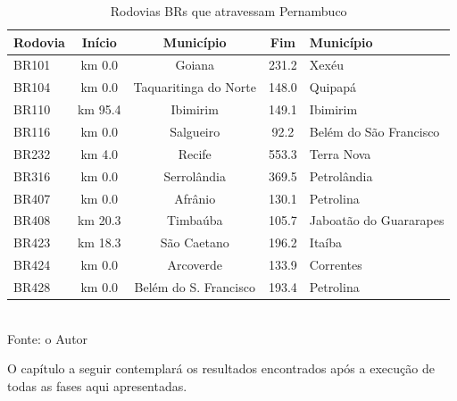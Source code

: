 \begin{table}[!ht]
	\centering
	\caption{Rodovias BRs que atravessam Pernambuco}
	\vspace{1mm}
	\begin{tabular}{l|c|c|c|l}
		\hline
		\textbf{Rodovia} & \textbf{Início} & \textbf{Município}  & \textbf{Fim} & \textbf{Município} \\
		\hline
		BR101 & km 0.0 & Goiana & 231.2 & Xexéu\\
		BR104 & km 0.0 & Taquaritinga do Norte & 148.0 & Quipapá\\
		BR110 & km 95.4 & Ibimirim & 149.1 & Ibimirim\\
		BR116 & km 0.0 & Salgueiro & 92.2 & Belém do São Francisco\\
		BR232 & km 4.0 & Recife & 553.3 & Terra Nova\\
		BR316 & km 0.0 & Serrolândia & 369.5 & Petrolândia\\
		BR407 & km 0.0 & Afrânio & 130.1 & Petrolina\\
		BR408 & km 20.3 & Timbaúba & 105.7 & Jaboatão do Guararapes\\
		BR423 & km 18.3 & São Caetano & 196.2 & Itaíba\\
		BR424 & km 0.0 & Arcoverde & 133.9 & Correntes\\
		BR428 & km 0.0 & Belém do S. Francisco & 193.4 & Petrolina\\
	\end{tabular}
	\\
	\tiny Fonte: o Autor
\end{table}

\vspace{7mm}

O capítulo a seguir contemplará os resultados encontrados após a execução de todas as fases aqui apresentadas.


